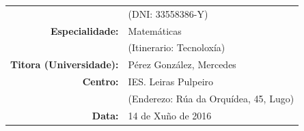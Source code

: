 \begin{titlepage}
\begin{bottompar}
\begin{flushright}
\begin{tabular}{rl}
        & \small{(DNI: 33558386-Y)} \\

        \large{\textbf{Especialidade:}}
        & \large{Matemáticas} \\

        & \small{(Itinerario: Tecnoloxía)} \\


        \large{\textbf{Titora (Universidade):}}
        & \large{Pérez González, Mercedes} \\

        \large{\textbf{Centro:}}
        & \large{IES. Leiras Pulpeiro} \\

        & \small{(Enderezo: Rúa da Orquídea, 45, Lugo)} \\

        \large{\textbf{Data:}}
        & \large{14 de Xuño de 2016} \\
      \end{tabular}
    \end{flushright}
  \end{bottompar}

\end{titlepage}
